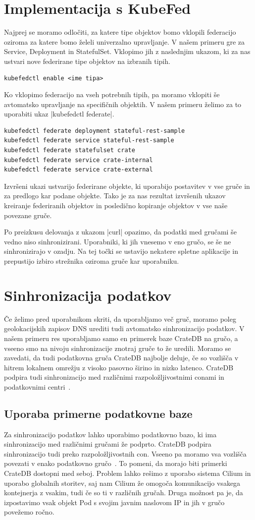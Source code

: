 \documentclass[a4paper, 12pt]{book}
\begin{document}
\section{Implementacija s KubeFed}
Najprej se moramo odločiti, za katere tipe objektov bomo vklopili federacijo oziroma za katere bomo želeli univerzalno upravljanje.
V našem primeru gre za Service, Deployment in StatefulSet.
Vklopimo jih z naslednjim ukazom, ki za nas ustvari nove federirane tipe objektov na izbranih tipih.
\begin{verbatim}
kubefedctl enable <ime tipa>
\end{verbatim}
Ko vklopimo federacijo na vseh potrebnih tipih, pa moramo vklopiti še avtomatsko upravljanje na specifičnih objektih.
V našem primeru želimo za to uporabiti ukaz \spverb|kubefedctl federate|.
\begin{verbatim}
kubefedctl federate deployment stateful-rest-sample
kubefedctl federate service stateful-rest-sample
kubefedctl federate statefulset crate
kubefedctl federate service crate-internal
kubefedctl federate service crate-external
\end{verbatim}
Izvršeni ukazi ustvarijo federirane objekte, ki uporabijo postavitev v vse gruče in za predlogo kar podane objekte.
Tako je za nas rezultat izvršenih ukazov kreiranje federiranih objektov in posledično kopiranje objektov v vse naše povezane gruče.

Po preizkusu delovanja z ukazom \spverb|curl| opazimo, da podatki med gručami še vedno niso sinhronizirani.
Uporabniki, ki jih vnesemo v eno gručo, se še ne sinhronizirajo v ozadju.
Na tej točki se ustavijo nekatere spletne aplikacije in prepustijo izbiro strežnika oziroma gruče kar uporabniku.
\section{Sinhronizacija podatkov}
Če želimo pred uporabnikom skriti, da uporabljamo več gruč, moramo poleg geolokacijskih zapisov DNS urediti tudi avtomatsko sinhronizacijo podatkov.
V našem primeru res uporabljamo samo en primerek baze CrateDB na gručo, a vseeno smo na nivoju sinhronizacije znotraj gruče to že uredili. 
Moramo se zavedati, da tudi podatkovna gruča CrateDB najbolje deluje, če so vozlišča v hitrem lokalnem omrežju z visoko pasovno širino in nizko latenco.
CrateDB podpira tudi sinhronizacijo med različnimi razpoložljivostnimi conami in podatkovnimi centri~\cite{cratedb-zone}.
\subsection{Uporaba primerne podatkovne baze}
Za sinhronizacijo podatkov lahko uporabimo podatkovno bazo, ki ima sinhronizacijo med različnimi gručami že podprto.
CrateDB podpira sinhronizacijo tudi preko razpoložljivostnih con.
Vseeno pa moramo vsa vozlišča povezati v enako podatkovno gručo~\cite{cratedb-zone}.
To pomeni, da morajo biti primerki CrateDB dostopni med seboj.
Problem lahko rešimo z uporabo sistema Cilium in uporabo globalnih storitev, saj nam Cilium že omogoča komunikacijo vsakega kontejnerja z vsakim, tudi če so ti v različnih gručah.
Druga možnost pa je, da izpostavimo vsak objekt Pod s svojim javnim naslovom IP in jih v gručo povežemo ročno.
\end{document}
